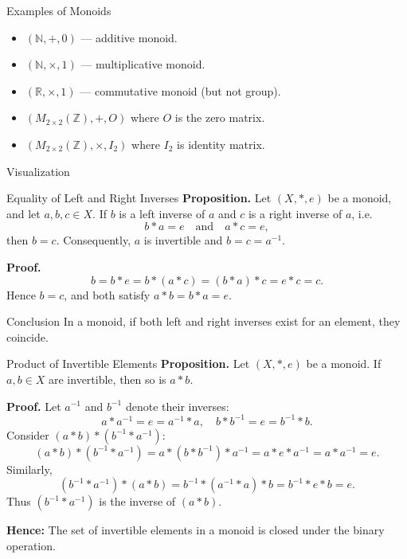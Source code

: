 \documentclass[11pt,aspectratio=43,ignorenonframetext,t]{beamer}
\begin{document}
\begin{frame}{Examples of Monoids}
\begin{block}{}
    \begin{itemize}
  \item $(\mathbb{N}, +, 0)$ — additive monoid.
  \item $(\mathbb{N}, \times, 1)$ — multiplicative monoid.
  \item $(\mathbb{R}, \times, 1)$ — commutative monoid (but not group).
  \item $(M_{2\times2}(\mathbb{Z}), +, O)$ where $O$ is the zero matrix.
  \item $(M_{2\times2}(\mathbb{Z}), \times, I_2)$ where $I_2$ is identity matrix.
\end{itemize}
\end{block}

\begin{block}{Visualization}
\begin{center}
\end{center}
\end{block}
\end{frame}


\begin{frame}{Equality of Left and Right Inverses}
\textbf{Proposition.}  
Let $(X, *, e)$ be a monoid, and let $a, b, c \in X$.  
If $b$ is a left inverse of $a$ and $c$ is a right inverse of $a$, i.e.
\[
b * a = e \quad \text{and} \quad a * c = e,
\]
then \(b = c\).  
Consequently, \(a\) is invertible and \(b=c=a^{-1}\).

\textbf{Proof.}
\[
b = b * e = b * (a * c) = (b * a) * c = e * c = c.
\]
Hence $b=c$, and both satisfy $a * b = b * a = e$.

\begin{block}{Conclusion}
In a monoid, if both left and right inverses exist for an element, they coincide.
\end{block}
\end{frame}

\begin{frame}{Product of Invertible Elements}
\textbf{Proposition.}  
Let $(X, *, e)$ be a monoid.  
If $a,b \in X$ are invertible, then so is $a*b$.

\textbf{Proof.}
Let $a^{-1}$ and $b^{-1}$ denote their inverses:
\[
a * a^{-1} = e = a^{-1} * a, \quad b * b^{-1} = e = b^{-1} * b.
\]
Consider $(a*b) * (b^{-1} * a^{-1})$:
\[
(a*b) * (b^{-1} * a^{-1}) = a*(b*b^{-1})*a^{-1} = a*e*a^{-1} = a*a^{-1} = e.
\]
Similarly,
\[
(b^{-1} * a^{-1}) * (a*b) = b^{-1}*(a^{-1}*a)*b = b^{-1}*e*b = e.
\]
Thus $(b^{-1}*a^{-1})$ is the inverse of $(a*b)$.

\textbf{Hence:} The set of invertible elements in a monoid is closed under the binary operation.
\end{frame}
\end{document}
